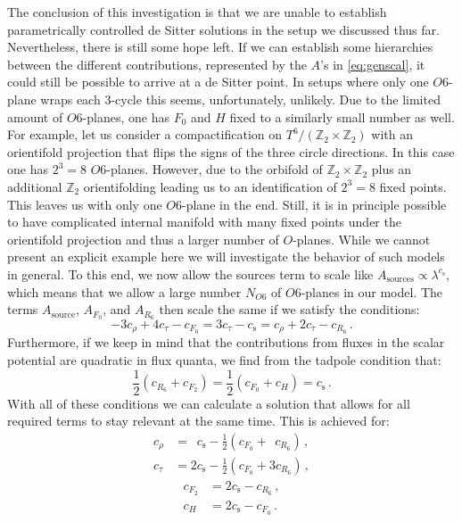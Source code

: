 \documentclass[a4paper,12pt,twoside,openright]{report}
\newcommand{\be}{\begin{equation}}
\newcommand{\ee}{\end{equation}}
\newcommand{\bea}{\begin{equation}\begin{aligned}}
\newcommand{\eea}{\end{aligned}\end{equation}}
\begin{document}
The conclusion of this investigation is that we are unable to establish parametrically controlled de Sitter solutions in the setup we discussed thus far. Nevertheless, there is still some hope left. If we can establish some hierarchies between the different contributions, represented by the $A$'s in \eqref{eq:genscal}, it could still be possible to arrive at a de Sitter point. In setups where only one $O6$-plane wraps each 3-cycle \cite{Danielsson:2011au} this seems, unfortunately, unlikely. Due to the limited amount of $O6$-planes, one has $F_0$ and $H$ fixed to a similarly small number as well. For example, let us consider a compactification on $T^ 6/(\mathbb{Z}_2 \times \mathbb{Z}_2)$ with an orientifold projection that flips the signs of the three circle directions. In this case one has $2^ 3 = 8$ $O6$-planes. However, due to the orbifold of $\mathbb{Z}_2 \times \mathbb{Z}_2$ plus an additional $\mathbb{Z}_2$ orientifolding leading us to an identification of $2^ 3 = 8$ fixed points. This leaves us with only one $O6$-plane in the end. Still, it is in principle possible to have complicated internal manifold with many fixed points under the orientifold projection and thus a larger number of $O$-planes. While we cannot present an explicit example here we will investigate the behavior of such models in general. To this end, we now allow the sources term to scale like $A_{\text{sources}} \propto \lambda^ {c_\text{s}}$, which means that we allow a large number $N_{O6}$ of $O6$-planes in our model. The terms $A_{\text{source}}$, $A_{F_0}$, and $A_{R_6}$ then scale the same if we satisfy the conditions:
\be 
-3 c_\rho + 4 c_\tau -c_{F_0} = 3 c_\tau - c_{\text{s}} = c_\rho + 2 c_\tau -c_{R_6}\,.
\ee
Furthermore, if we keep in mind that the contributions from fluxes in the scalar potential are quadratic in flux quanta, we find from the tadpole condition that:
\be 
\frac{1}{2} \left( c_{R_6} + c_{F_2} \right) = \frac{1}{2} \left( c_{F_0} + c_H \right) = c_{\text{s}}\,.
\ee
With all of these conditions we can calculate a solution that allows for all required terms to stay relevant at the same time. This is achieved for:
\bea 
c_\rho &= \hspace{6pt} c_{\text{s}} - \frac{1}{2} \left( c_{F_0} + \;\, c_{R_6} \right)\,,\\
c_\tau &= 2 c_{\text{s}} - \frac{1}{2} \left(c_{F_0} + 3 c_{R_6} \right)\,,
\eea
\begin{equation*}
     \begin{aligned}
c_{F_2} &= 2 c_{\text{s}} - c_{R_6}\,,\\
c_{H} &= 2 c_{\text{s}} - c_{F_0}\,.
     \end{aligned}
\end{equation*}
\end{document}
